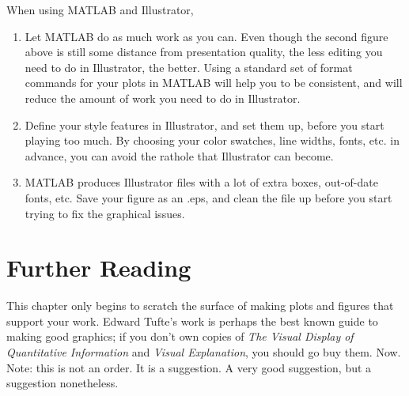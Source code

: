 \documentclass{tufte-handout}
\begin{document}
When using MATLAB and Illustrator, 
\begin{enumerate}
\item Let MATLAB do as much work as you can.  Even though the second figure above is still some distance from presentation quality, the less editing you need to do in Illustrator, the better.  Using a standard set of format commands for your plots in MATLAB will help you to be consistent, and will reduce the amount of work you need to do in Illustrator.
\item Define your style features in Illustrator, and set them up, before you start playing too much.  By choosing your color swatches, line widths, fonts, etc. in advance, you can avoid the rathole that Illustrator can become.
\item MATLAB produces Illustrator files with a lot of extra boxes, out-of-date fonts, etc.  Save your figure as an .eps, and clean the file up before you start trying to fix the graphical issues. 
\end{enumerate}

\section{Further Reading}

This chapter only begins to scratch the surface of making plots and figures that support your work.  Edward Tufte's work is perhaps the best known guide to making good graphics; if you don't own copies of {\it The Visual Display of Quantitative Information} and {\it Visual Explanation}, you should go buy them.  Now.  Note: this is not an order.  It is a suggestion.  A very good suggestion, but a suggestion nonetheless.
\end{document}
